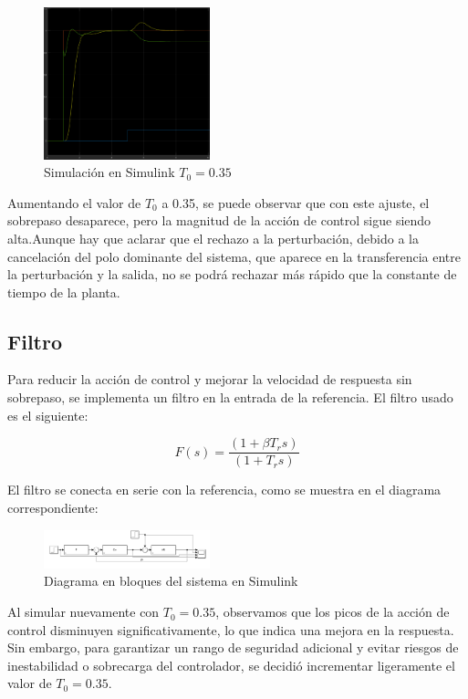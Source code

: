 \documentclass[letterpaper, 10 pt, conference]{ieeeconf}  %
\begin{document}
\begin{figure}[H]
  \centering
  \includegraphics[width=0.43\textwidth]{./IMAGENES/pid2.png}
  \caption{Simulación en Simulink \(T_{0} = 0.35\)}
  \label{fig:pid2}
\end{figure}

Aumentando el valor de $T_{0}$ a 0.35, se puede observar que con este ajuste, el sobrepaso desaparece, pero la magnitud de la acción de control sigue siendo alta.Aunque hay que aclarar que el rechazo a la perturbación, debido a la cancelación del polo dominante del sistema, que aparece en la transferencia entre la perturbación y la salida, no se podrá rechazar más rápido que la constante de tiempo de la planta.

\subsection{Filtro}

Para reducir la acción de control y mejorar la velocidad de respuesta sin sobrepaso, se implementa un filtro en la entrada de la referencia. El filtro usado es el siguiente:

\begin{equation*}
  F(s) = \frac{(1+\beta T_{r}s)}{(1+T_{r}s)}
\end{equation*}

El filtro se conecta en serie con la referencia, como se muestra en el diagrama correspondiente:

\begin{figure}[H]
  \centering
  \includegraphics[width=0.43\textwidth]{./IMAGENES/pid3.png}
  \caption{Diagrama en bloques del sistema en Simulink}
  \label{fig:pid3}
\end{figure}

Al simular nuevamente con $T_{0}=0.35$, observamos que los picos de la acción de control disminuyen significativamente, lo que indica una mejora en la respuesta. Sin embargo, para garantizar un rango de seguridad adicional y evitar riesgos de inestabilidad o sobrecarga del controlador, se decidió incrementar ligeramente el valor de $T_{0}=0.35$.
\end{document}
